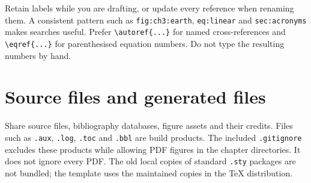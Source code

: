 Retain labels while you are drafting, or update every reference when renaming
them. A consistent pattern such as \texttt{fig:ch3:earth}, \texttt{eq:linear}
and \texttt{sec:acronyms} makes searches useful. Prefer \verb|\autoref{...}|
for named cross-references and \verb|\eqref{...}| for parenthesised equation
numbers. Do not type the resulting numbers by hand.

\section{Source files and generated files}
Share source files, bibliography databases, figure assets and their credits.
Files such as \texttt{.aux}, \texttt{.log}, \texttt{.toc} and \texttt{.bbl} are
build products. The included \texttt{.gitignore} excludes these products while
allowing PDF figures in the chapter directories. It does not ignore every PDF.
The old local copies of standard \texttt{.sty} packages are not bundled; the
template uses the maintained copies in the TeX distribution.
